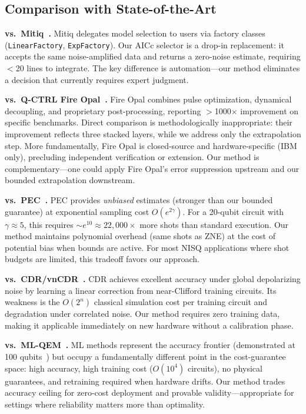 \subsection{Comparison with State-of-the-Art}

\textbf{vs.\ Mitiq~\cite{LaRose2022}.} Mitiq delegates model selection to users via factory classes (\texttt{LinearFactory}, \texttt{ExpFactory}). Our AICc selector is a drop-in replacement: it accepts the same noise-amplified data and returns a zero-noise estimate, requiring $<$20 lines to integrate. The key difference is automation---our method eliminates a decision that currently requires expert judgment.

\textbf{vs.\ Q-CTRL Fire Opal~\cite{Mundada2023}.} Fire Opal combines pulse optimization, dynamical decoupling, and proprietary post-processing, reporting $>$1000$\times$ improvement on specific benchmarks. Direct comparison is methodologically inappropriate: their improvement reflects three stacked layers, while we address only the extrapolation step. More fundamentally, Fire Opal is closed-source and hardware-specific (IBM only), precluding independent verification or extension. Our method is complementary---one could apply Fire Opal's error suppression upstream and our bounded extrapolation downstream.

\textbf{vs.\ PEC~\cite{Temme2017, vandenBerg2023}.} PEC provides \emph{unbiased} estimates (stronger than our bounded guarantee) at exponential sampling cost $O(e^{2\gamma})$. For a 20-qubit circuit with $\gamma \approx 5$, this requires $\sim$$e^{10} \approx 22{,}000\times$ more shots than standard execution. Our method maintains polynomial overhead (same shots as ZNE) at the cost of potential bias when bounds are active. For most NISQ applications where shot budgets are limited, this tradeoff favors our approach.

\textbf{vs.\ CDR/vnCDR~\cite{Czarnik2021, Lowe2021}.} CDR achieves excellent accuracy under global depolarizing noise by learning a linear correction from near-Clifford training circuits. Its weakness is the $O(2^n)$ classical simulation cost per training circuit and degradation under correlated noise. Our method requires zero training data, making it applicable immediately on new hardware without a calibration phase.

\textbf{vs.\ ML-QEM~\cite{Liao2024, Wang2026}.} ML methods represent the accuracy frontier (demonstrated at 100 qubits~\cite{Liao2024}) but occupy a fundamentally different point in the cost-guarantee space: high accuracy, high training cost ($O(10^4)$ circuits), no physical guarantees, and retraining required when hardware drifts. Our method trades accuracy ceiling for zero-cost deployment and provable validity---appropriate for settings where reliability matters more than optimality.

